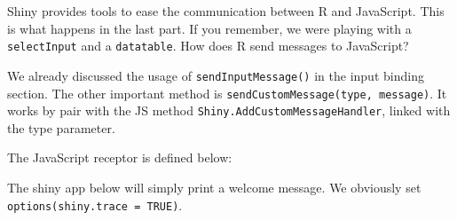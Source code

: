 \documentclass[]{book}
\newenvironment{Shaded}{\begin{snugshade}}{\end{snugshade}}
\newcommand{\AttributeTok}[1]{\textcolor[rgb]{0.77,0.63,0.00}{#1}}
\newcommand{\ControlFlowTok}[1]{\textcolor[rgb]{0.13,0.29,0.53}{\textbf{#1}}}
\newcommand{\DataTypeTok}[1]{\textcolor[rgb]{0.13,0.29,0.53}{#1}}
\newcommand{\KeywordTok}[1]{\textcolor[rgb]{0.13,0.29,0.53}{\textbf{#1}}}
\newcommand{\NormalTok}[1]{#1}
\newcommand{\OperatorTok}[1]{\textcolor[rgb]{0.81,0.36,0.00}{\textbf{#1}}}
\newcommand{\SpecialCharTok}[1]{\textcolor[rgb]{0.00,0.00,0.00}{#1}}
\newcommand{\StringTok}[1]{\textcolor[rgb]{0.31,0.60,0.02}{#1}}
\newcommand{\VariableTok}[1]{\textcolor[rgb]{0.00,0.00,0.00}{#1}}
\newcommand{\VerbatimStringTok}[1]{\textcolor[rgb]{0.31,0.60,0.02}{#1}}
\begin{document}
Shiny provides tools to ease the communication between R and JavaScript. This is what happens in the last part. If you remember, we were playing with a \texttt{selectInput} and a \texttt{datatable}. How does R send messages to JavaScript?

We already discussed the usage of \texttt{sendInputMessage()} in the input binding section. The other important method is \texttt{sendCustomMessage(type,\ message)}. It works by pair with the JS method \texttt{Shiny.AddCustomMessageHandler}, linked with the type parameter.

\begin{Shaded}
\end{Shaded}

The JavaScript receptor is defined below:

\begin{Shaded}
\end{Shaded}

The shiny app below will simply print a welcome message. We obviously set \texttt{options(shiny.trace\ =\ TRUE)}.
\end{document}
